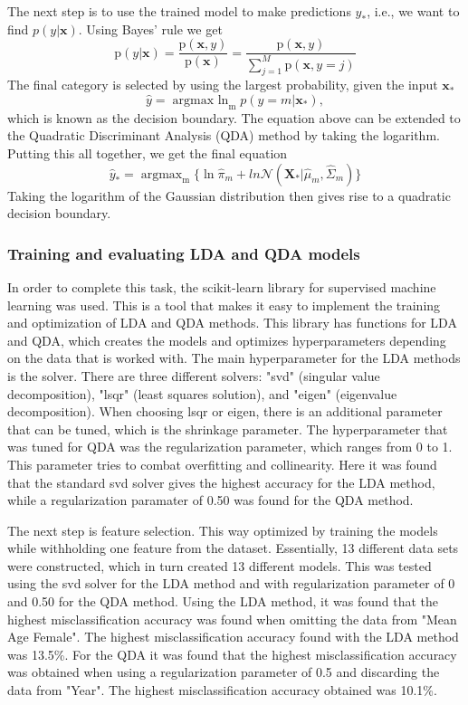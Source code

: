 \documentclass{article}
\begin{document}
The next step is to use the trained model to make predictions $y_*$, i.e., we want to find $p(y|\textbf{x})$. Using Bayes' rule we get
\begin{equation}
    \text{p}(y|\textbf{x})=\frac{\text{p}(\textbf{x},y)}{\text{p}(\textbf{x})}=\frac{\text{p}(\textbf{x},y)}{\sum^{M}_{j=1}\text{p}(\textbf{x},y=j)}
\end{equation}
The final category is selected by using the largest probability, given the input $\mathbf{x_*}$ 
\begin{equation}
    \hat{y}=\mathop{\text{argmax ln}}_{\text{m}}p(y=m|\textbf{x}_*),
\end{equation}
which is known as the decision boundary. The equation above can be extended to the Quadratic Discriminant Analysis (QDA) method by taking the logarithm. Putting this all together, we get the final equation
\begin{equation}
    \hat{y}_*=\mathop\text{argmax}_{\text{m}}\{\ln\hat{\pi}_m+ln\mathcal{N}(\textbf{X}_*|\hat{\mu}_m,\hat{\Sigma}_m)\}
\end{equation}
Taking the logarithm of the Gaussian distribution then gives rise to a quadratic decision boundary.
\subsubsection{Training and evaluating LDA and QDA models}
In order to complete this task, the scikit-learn library for supervised machine learning was used. This is a tool that makes it easy to implement the training and optimization of LDA and QDA methods. This library has functions for LDA and QDA, which creates the models and optimizes hyperparameters depending on the data that is worked with. The main hyperparameter for the LDA methods is the solver. There are three different solvers: "svd" (singular value decomposition), "lsqr" (least squares solution), and "eigen" (eigenvalue decomposition). When choosing lsqr or eigen, there is an additional parameter that can be tuned, which is the shrinkage parameter. The hyperparameter that was tuned for QDA was the regularization parameter, which ranges from 0 to 1. This parameter tries to combat overfitting and collinearity. Here it was found that the standard svd solver gives the highest accuracy for the LDA method, while a regularization paramater of 0.50 was found for the QDA method.

The next step is feature selection. This way optimized by training the models while withholding one feature from the dataset. Essentially, 13 different data sets were constructed, which in turn created 13 different models. This was tested using the svd solver for the LDA method and with regularization parameter of 0 and 0.50 for the QDA method. Using the LDA method, it was found that the highest misclassification accuracy was found when omitting the data from "Mean Age Female". The highest misclassification accuracy found with the LDA method was 13.5\%. For the QDA it was found that the highest misclassification accuracy was obtained when using a regularization parameter of 0.5 and discarding the data from "Year". The highest misclassification accuracy obtained was 10.1\%.
\end{document}
